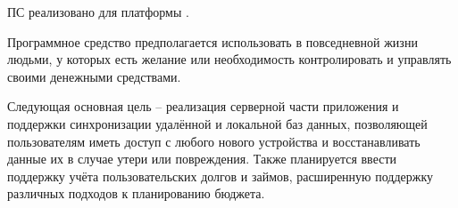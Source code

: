 ПС реализовано для платформы \andro.

Программное средство предполагается использовать в повседневной жизни людьми, у которых есть желание или необходимость контролировать и управлять своими денежными средствами.

Следующая основная цель -- реализация серверной части приложения и поддержки синхронизации удалённой и локальной баз данных, позволяющей пользователям иметь доступ с любого нового устройства и восстанавливать данные их в случае утери или повреждения.
Также планируется ввести поддержку учёта пользовательских долгов и займов, расширенную поддержку различных подходов к планированию бюджета.